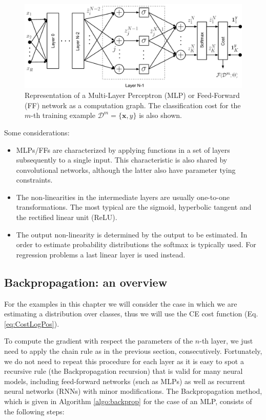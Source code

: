\begin{figure}[!hb]
\centering
\includegraphics[scale=0.6]{figs/deep_learning/NN2.pdf}
\caption{Representation of a Multi-Layer Perceptron (MLP) or Feed-Forward (FF) network as a computation graph. The classification cost
for the $m$-th training example $\mathcal{D}^m=\{\mathbf{x}, y\}$ is also
shown.}
\label{fig:FF}
\end{figure}

\noindent Some considerations:
%
\begin{itemize}
\item MLPs/FFs are characterized by applying functions in a set of layers subsequently to a single input. This characteristic is also shared by convolutional networks, although the latter also have parameter tying constraints.
\item The non-linearities in the intermediate layers are usually one-to-one transformations. The most typical are the sigmoid, hyperbolic tangent and the rectified linear unit (ReLU).
\item The output non-linearity is determined by the output to be estimated. In order to estimate probability distributions the softmax is typically used. For regression problems a last linear layer is used instead.
\end{itemize}

\subsection{Backpropagation: an overview}

For the examples in this chapter we will consider the case in which we are
estimating a distribution over classes, thus we will use the CE cost function
(Eq. \ref{eq:CostLogPos}).

To compute the gradient with respect the parameters of the $n$-th layer, we
just need to apply the chain rule as in the previous section, consecutively.
Fortunately, we do not need to repeat this procedure for each layer as it is
easy to spot a recursive rule (the Backpropagation recursion) that is valid
for many neural models, including feed-forward networks (such as MLPs) as well
as recurrent neural networks (RNNs) with minor modifications. The
Backpropagation method, which is given in Algorithm \ref{algo:backprop} for
the case of an MLP, consists of the following steps:


